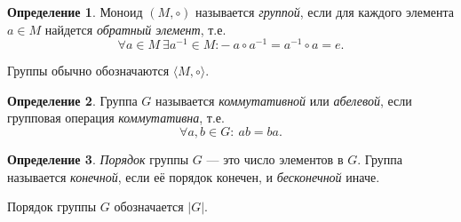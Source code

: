 \documentclass[a4paper, 14pt]{extarticle}
\newcommand{\n}{\par}
\newcommand{\suchthat}{{:}{-} \ }
\theoremstyle{definition}
\newtheorem{definition}{Определение}
\theoremstyle{plain}
\numberwithin{theorem}{section}
\numberwithin{definition}{section}
\numberwithin{statement}{section}
\numberwithin{lemma}{section}
\numberwithin{consequence}{section}
\begin{document}
	\begin{definition}
		Моноид $(M, \circ)$ называется \textit{группой}, если для каждого элемента $a \in M$ найдется \textit{обратный элемент}, т.е.
		\begin{equation*} 
			\forall a \in M \ \exists a^{-1} \in M \suchthat a \circ a^{-1} = a^{-1} \circ a = e.
		\end{equation*} \n
		Группы обычно обозначаются $\langle M, \circ \rangle.$
	\end{definition}
	\begin{definition}
		Группа $G$ называется \textit{коммутативной} или \textit{абелевой}, если групповая операция \textit{коммутативна}, т.е.
		\begin{equation*}
			\forall a, b \in G{:} \ ab = ba.
		\end{equation*}
	\end{definition}
	\thispagestyle{empty}
	\begin{definition}
		\textit{Порядок} группы $G$ — это число элементов в $G$. Группа называется \textit{конечной}, если её порядок конечен, и \textit{бесконечной} иначе. \n
		Порядок группы $G$ обозначается $|G|$.
	\end{definition} 
	\newpage
\end{document}

